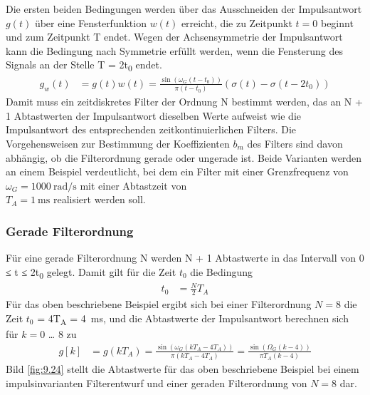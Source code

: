 Die ersten beiden Bedingungen werden über das Ausschneiden der Impulsantwort \(g(t)\) über eine Fensterfunktion \(w(t)\) erreicht, die zu Zeitpunkt \(t = 0\) beginnt und zum Zeitpunkt T endet. Wegen der Achsensymmetrie der Impulsantwort kann die Bedingung nach Symmetrie erfüllt werden, wenn die Fensterung des Signals an der Stelle T = 2t\textsubscript{0} endet.
\begin{align}
g_{w}(t) &= g(t)  w(t) = \frac{\sin\left( \omega_{G}  \left( t - t_{0} \right) \right)}{\pi  \left( t - t_{0} \right)}  \left( \sigma(t) - \sigma\left( t - 2  t_{0} \right) \right) \label{eq:9.113}
\end{align}
Damit muss ein zeitdiskretes Filter der Ordnung N bestimmt werden, das an N + 1 Abtastwerten der Impulsantwort dieselben Werte aufweist wie die Impulsantwort des entsprechenden zeitkontinuierlichen Filters. Die Vorgehensweisen zur Bestimmung der Koeffizienten \(b_{m}\) des Filters sind davon abhängig, ob die Filterordnung gerade oder ungerade ist. Beide Varianten werden an einem Beispiel verdeutlicht, bei dem ein Filter mit einer Grenzfrequenz von \(ω_{G} = \qty{1000}{\radian\per\second}\) mit einer Abtastzeit von\\
\(T_{A} = \qty{1}{\milli\second}\) realisiert werden soll.

\subsubsection{Gerade Filterordnung}\label{sec:gerade-filterordnung}

Für eine gerade Filterordnung N werden N + 1 Abtastwerte in das Intervall von 0 ≤ t ≤ 2t\textsubscript{0} gelegt. Damit gilt für die Zeit \(t_{0}\) die Bedingung
\begin{align}
t_{0} &= \frac{N}{2}  T_{A} \label{eq:9.114}
\end{align}
Für das oben beschriebene Beispiel ergibt sich bei einer Filterordnung \(N = 8\) die Zeit \(t_{0}\) = 4T\textsubscript{A} = \qty{4}{\milli\second}, und die Abtastwerte der Impulsantwort berechnen sich für \(k = 0\) \ldots{} 8 zu
\begin{align}
g[ k] &= g\left( k  T_{A} \right) = \frac{\sin\left( \omega_{G}  \left( k  T_{A} - 4  T_{A} \right) \right)}{\pi  \left( k  T_{A} - 4  T_{A} \right)} = \frac{\sin\left( \Omega_{G}  (k - 4) \right)}{\pi  T_{A}  (k - 4)} \label{eq:9.115}
\end{align}
Bild \ref{fig:9.24} stellt die Abtastwerte für das oben beschriebene Beispiel bei einem impulsinvarianten Filterentwurf und einer geraden Filterordnung von \(N = 8\) dar.

